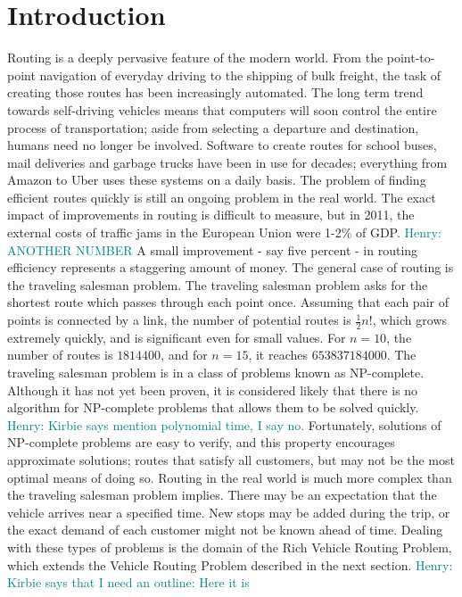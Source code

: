 \documentclass{sig-alternate}
\newcommand{\allcomments}[1]{{#1}}
\newcommand{\hfcomment}[1]{\textcolor{Teal}{\allcomments{Henry: {#1}}}}
\begin{document}
\section{Introduction}
\label{sec:intro}
Routing is a deeply pervasive feature of the modern world. From the point-to-point navigation of everyday driving to the shipping of bulk freight, the task of creating those routes has been increasingly automated. The long term trend towards self-driving vehicles means that computers will soon control the entire process of transportation; aside from selecting a departure and destination, humans need no longer be involved. Software to create routes for school buses, mail deliveries and garbage trucks have been in use for decades; everything from Amazon to Uber uses these systems on a daily basis. The problem of finding efficient routes quickly is still an ongoing problem in the real world. The exact impact of improvements in routing is difficult to measure, but in 2011, the external costs of traffic jams in the European Union were 1-2\% of GDP\cite{Caceres-Cruz:2014}. \hfcomment{ANOTHER NUMBER}
A small improvement - say five percent - in routing efficiency represents a staggering amount of money. The general case of routing is the traveling salesman problem. The traveling salesman problem asks for the shortest route which passes through each point once. Assuming that each pair of points is connected by a link, the number of potential routes is $\tfrac{1}{2}n!$, which grows extremely quickly, and is significant even for small values. For $n=10$, the number of routes is $1814400$, and for $n=15$, it reaches $653837184000$. The traveling salesman problem is in a class of problems known as NP-complete. Although it has not yet been proven, it is considered likely that there is no algorithm for NP-complete problems that allows them to be solved quickly. \hfcomment{Kirbie says mention polynomial time, I say no.} Fortunately, solutions of NP-complete problems are easy to verify, and this property encourages approximate solutions; routes that satisfy all customers, but may not be the most optimal means of doing so. 
Routing in the real world is much more complex than the traveling salesman problem implies. There may be an expectation that the vehicle arrives near a specified time. New stops may be added during the trip, or the exact demand of each customer might not be known ahead of time. Dealing with these types of problems is the domain of the Rich Vehicle Routing Problem, which extends the Vehicle Routing Problem described in the next section.
\hfcomment{Kirbie says that I need an outline: Here it is}
\end{document}
